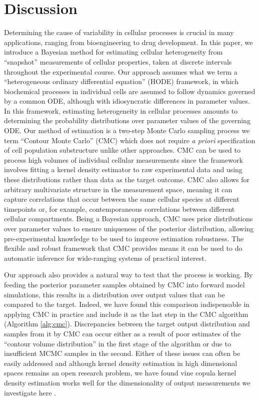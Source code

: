 \section{Discussion}
\label{sec:discussion}
Determining the cause of variability in cellular processes is crucial in many applications, ranging from bioengineering to drug development. In this paper, we introduce a Bayesian method for estimating cellular heterogeneity from ``snapshot'' measurements of cellular properties, taken at discrete intervals throughout the experimental course. Our approach assumes what we term a ``heterogeneous ordinary differential equation'' (HODE) framework, in which biochemical processes in individual cells are assumed to follow dynamics governed by a common ODE, although with idiosyncratic differences in parameter values. In this framework, estimating heterogeneity in cellular processes amounts to determining the probability distributions over parameter values of the governing ODE. Our method of estimation is a two-step Monte Carlo sampling process we term ``Contour Monte Carlo'' (CMC) which does not require \textit{a priori} specification of cell population substructure unlike other approaches. CMC can be used to process high volumes of individual cellular measurements since the framework involves fitting a kernel density estimator to raw experimental data and using these distributions rather than data as the target outcome. CMC also allows for arbitrary multivariate structure in the measurement space, meaning it can capture correlations that occur between the same cellular species at different timepoints or, for example, contemporaneous correlations between different cellular compartments. Being a Bayesian approach, CMC uses prior distributions over parameter values to ensure uniqueness of the posterior distribution, allowing pre-experimental knowledge to be used to improve estimation robustness. The flexible and robust framework that CMC provides means it can be used to do automatic inference for wide-ranging systems of practical interest.

Our approach also provides a natural way to test that the process is working. By feeding the posterior parameter samples obtained by CMC into forward model simulations, this results in a distribution over output values that can be compared to the target. Indeed, we have found this comparison indispensable in applying CMC in practice and include it as the last step in the CMC algorithm (Algorithm \ref{alg:cmc}). Discrepancies between the target output distribution and samples from it by CMC can occur either as a result of poor estimates of the ``contour volume distribution'' in the first stage of the algorithm or due to insufficient MCMC samples in the second. Either of these issues can often be easily addressed and although kernel density estimation in high dimensional spaces remains an open research problem, we have found vine copula kernel density estimation works well for the dimensionality of output measurements we investigate here \cite{nagler2016evading}.

